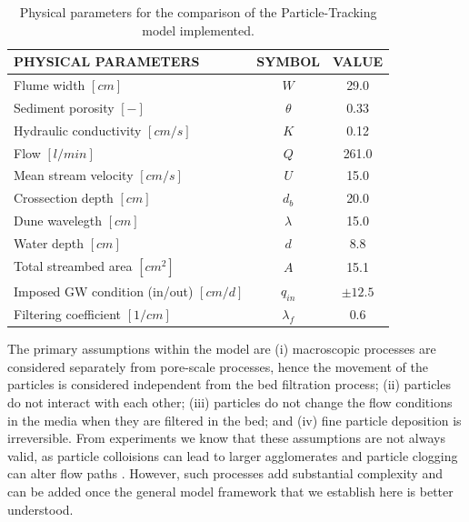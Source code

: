 \documentclass[draft,linenumbers]{agujournal2018}
\begin{document}
\begin{table}
\caption{Physical parameters \citep{Packman2000,Fox2014,Fox2018} for the comparison of the Particle-Tracking model implemented.}
\label{TF:Phys_Param}
\centering
\begin{tabular}{l c c}
\hline
PHYSICAL PARAMETERS						    & SYMBOL			& VALUE			\\
\hline
  Flume width $[cm]$  					    & $W$				& 29.0 			\\
  Sediment porosity $[-]$				    & $\theta$			& 0.33 			\\
  Hydraulic conductivity $[cm/s]$ 		    & $K$				& 0.12 			\\
  Flow $[l/min]$						    & $Q$				& 261.0			\\
  Mean stream velocity $[cm/s]$			    & $U$				& 15.0 			\\
  Crossection depth $[cm]$				    & $d_b$				& 20.0 			\\
  Dune wavelegth $[cm]$					    & $\lambda$			& 15.0 			\\
  Water depth $[cm]$					    & $d$				& 8.8 			\\
  Total streambed area $[cm^{2}]$		    & $A$				& 15.1	 		\\
  Imposed GW condition (in/out) $[cm/d]$    & $q_{in}$			& $\pm 12.5$	\\
  Filtering coefficient $[1/cm]$		    & $\lambda_f$		& 0.6			\\
\hline
\end{tabular}
\end{table}

The primary assumptions within the model are (i) macroscopic processes are considered separately from pore-scale processes, hence the movement of the particles is considered independent from the bed filtration process; (ii) particles do not interact with each other; (iii) particles do not change the flow conditions in the media when they are filtered in the bed; and (iv) fine particle deposition is irreversible. From experiments we know that these assumptions are not always valid, as particle colloisions can lead to larger agglomerates and particle clogging can alter flow paths \citep{Fox2018}. However, such processes add substantial complexity and can be added once the general model framework that we establish here is better understood. 
\end{document}

